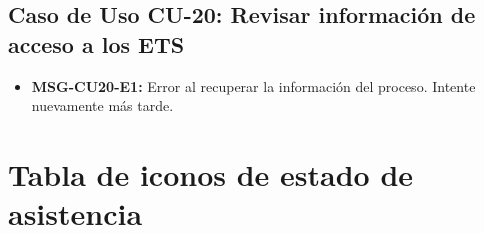 \subsection{Caso de Uso CU-20: Revisar información de acceso a los ETS}
	\begin{itemize}
		\item \textbf{\label{msg:CU20-E1}MSG-CU20-E1:} Error al recuperar la información del proceso. Intente nuevamente más tarde.
	\end{itemize}

\newpage

\section{Tabla de iconos de estado de asistencia}
\label{sec:tablaIconosAsistencia}


